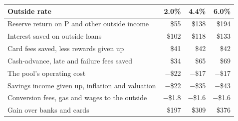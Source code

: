\begin{tabular}{lrrr}
\toprule
Outside rate & 2.0\% & 4.4\% & 6.0\% \\
\midrule
Reserve return on P and other outside income & \$55 & \$138 & \$194 \\
Interest saved on outside loans & \$102 & \$118 & \$133 \\
Card fees saved, less rewards given up & \$41 & \$42 & \$42 \\
Cash-advance, late and failure fees saved & \$34 & \$65 & \$69 \\
The pool's operating cost & $-$\$22 & $-$\$17 & $-$\$17 \\
Savings income given up, inflation and valuation & $-$\$22 & $-$\$35 & $-$\$43 \\
Conversion fees, gas and wages to the outside & $-$\$1.8 & $-$\$1.6 & $-$\$1.6 \\
\midrule
Gain over banks and cards & \$197 & \$309 & \$376 \\
\bottomrule
\end{tabular}
